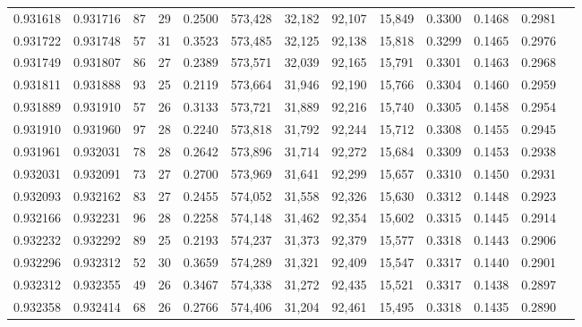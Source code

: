 \begin{tabular}{rrrrrrrrrrrrr}
0.931618 & 0.931716 &    87 &  29 &                                     0.2500 & 573,428 &  32,182 &  92,107 &  15,849 & 0.3300 & 0.1468 & 0.2981 \\
0.931722 & 0.931748 &    57 &  31 &                                     0.3523 & 573,485 &  32,125 &  92,138 &  15,818 & 0.3299 & 0.1465 & 0.2976 \\
0.931749 & 0.931807 &    86 &  27 &                                     0.2389 & 573,571 &  32,039 &  92,165 &  15,791 & 0.3301 & 0.1463 & 0.2968 \\
0.931811 & 0.931888 &    93 &  25 &                                     0.2119 & 573,664 &  31,946 &  92,190 &  15,766 & 0.3304 & 0.1460 & 0.2959 \\
0.931889 & 0.931910 &    57 &  26 &                                     0.3133 & 573,721 &  31,889 &  92,216 &  15,740 & 0.3305 & 0.1458 & 0.2954 \\
0.931910 & 0.931960 &    97 &  28 &                                     0.2240 & 573,818 &  31,792 &  92,244 &  15,712 & 0.3308 & 0.1455 & 0.2945 \\
0.931961 & 0.932031 &    78 &  28 &                                     0.2642 & 573,896 &  31,714 &  92,272 &  15,684 & 0.3309 & 0.1453 & 0.2938 \\
0.932031 & 0.932091 &    73 &  27 &                                     0.2700 & 573,969 &  31,641 &  92,299 &  15,657 & 0.3310 & 0.1450 & 0.2931 \\
0.932093 & 0.932162 &    83 &  27 &                                     0.2455 & 574,052 &  31,558 &  92,326 &  15,630 & 0.3312 & 0.1448 & 0.2923 \\
0.932166 & 0.932231 &    96 &  28 &                                     0.2258 & 574,148 &  31,462 &  92,354 &  15,602 & 0.3315 & 0.1445 & 0.2914 \\
0.932232 & 0.932292 &    89 &  25 &                                     0.2193 & 574,237 &  31,373 &  92,379 &  15,577 & 0.3318 & 0.1443 & 0.2906 \\
0.932296 & 0.932312 &    52 &  30 &                                     0.3659 & 574,289 &  31,321 &  92,409 &  15,547 & 0.3317 & 0.1440 & 0.2901 \\
0.932312 & 0.932355 &    49 &  26 &                                     0.3467 & 574,338 &  31,272 &  92,435 &  15,521 & 0.3317 & 0.1438 & 0.2897 \\
0.932358 & 0.932414 &    68 &  26 &                                     0.2766 & 574,406 &  31,204 &  92,461 &  15,495 & 0.3318 & 0.1435 & 0.2890 \\

\end{tabular}
